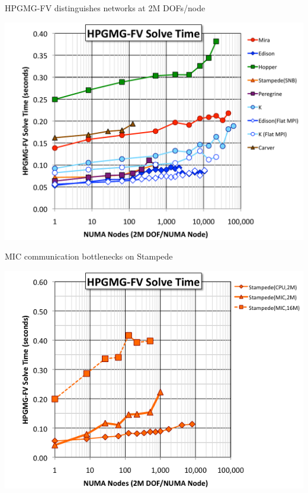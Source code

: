 \documentclass{beamer}
\begin{document}
\begin{frame}{HPGMG-FV distinguishes networks at 2M DOFs/node}
  \begin{center}
    \includegraphics[width=\textwidth]{figures/hpgmg/hpgmg-fv-201408-flatmpi-vs-openmp.pdf}
  \end{center}
\end{frame}

\begin{frame}{MIC communication bottlenecks on Stampede}
  \begin{center}
    \includegraphics[width=\textwidth]{figures/hpgmg/fv-mic-mpi.png}
  \end{center}
\end{frame}
\end{document}
